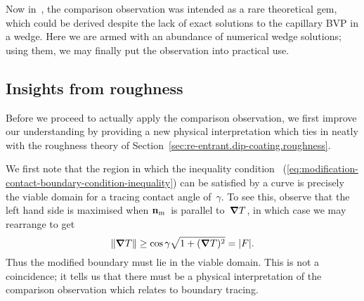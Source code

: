 Now in~\cite{anderson-2002-thesis-boundary-tracing-pdes},
the comparison observation was intended as a rare theoretical gem,
which could be derived despite the lack of exact solutions
to the capillary BVP in a wedge.
Here we are armed with an abundance of numerical wedge solutions;
using them, we may finally put the observation into practical use.

\subsection{Insights from roughness}
\label{sec:small.modification.insights}

Before we proceed to actually apply the comparison observation,
we first improve our understanding
by providing a new physical interpretation
which ties in neatly with the roughness theory
of Section~\ref{sec:re-entrant.dip-coating.roughness}.

We first note that the region in which the inequality condition~%
  (\ref{eq:modification-contact-boundary-condition-inequality})
can be satisfied by a curve
is precisely the viable domain for a tracing contact angle of~$\gamma$.
To see this, observe that the left hand side is maximised
when $\mathop{}\!\boldsymbol{\mathbf{n}}_{\mathrm{m}}$~is parallel to~$\mathop{}\!\boldsymbol{\mathbf{\nabla}} T$,
in which case we may rearrange to get
\[
  \lVert\mathop{}\!\boldsymbol{\mathbf{\nabla}} T\rVert \ge \cos\gamma \sqrt{1 + (\mathop{}\!\boldsymbol{\mathbf{\nabla}} T)^2} = \lvert F\rvert.
\]
Thus the modified boundary must lie in the viable domain.
This is not a coincidence;
it tells us that there must be
a physical interpretation of the comparison observation
which relates to boundary tracing.

